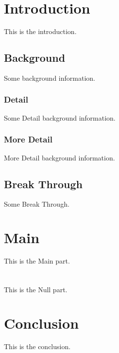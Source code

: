 \documentclass{article}
\begin{document}
\section{Introduction}
This is the introduction.

\subsection{Background}
Some background information.

\subsubsection{Detail}
Some Detail background information.

\subsubsection{More Detail}
More Detail background information.

\subsection{Break Through}
Some Break Through.


\section{Main}
This is the Main part.


\section{}
This is the Null part.


\section{Conclusion}
This is the conclusion.
\end{document}
